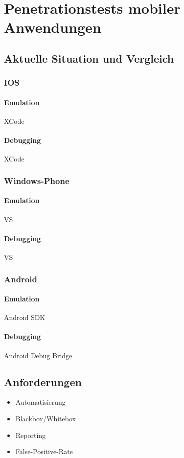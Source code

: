 \chapter{Penetrationstests mobiler Anwendungen}
	\section{Aktuelle Situation und Vergleich}
		\subsection{IOS}
			\subsubsection{Emulation}
			XCode
			\subsubsection{Debugging}
			XCode
		\subsection{Windows-Phone}
			\subsubsection{Emulation}
			VS
			\subsubsection{Debugging}
			VS	
		\subsection{Android}
			\subsubsection{Emulation}
			Android SDK
			\subsubsection{Debugging}	
			Android Debug Bridge\cite{androidDebugBridge}
	\section{Anforderungen}
	\begin{itemize}
		\item Automatisierung
		\item Blackbox/Whitebox
		\item Reporting
		\item False-Positive-Rate
	\end{itemize}
